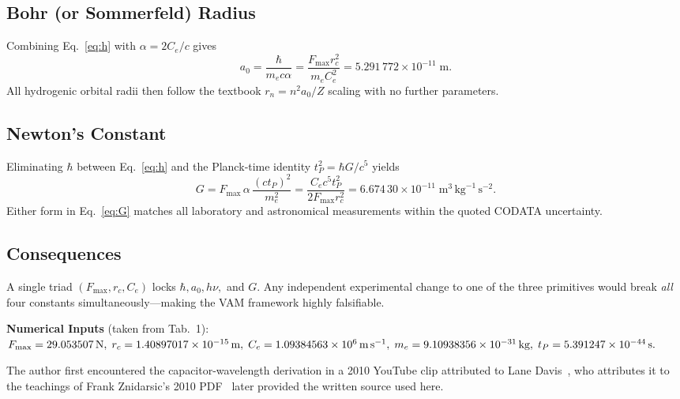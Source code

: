 \subsection{Bohr (or Sommerfeld) Radius}
Combining Eq.~\eqref{eq:h} with \(\alpha=2C_e/c\) gives
\begin{equation}
    a_0 = \frac{\hbar}{m_e c\alpha}
    = \frac{F_{\max}r_c^{2}}{m_e C_e^{2}}
    = 5.291\,772\times10^{-11}\;\text{m}.
    \label{eq:a0}
\end{equation}
All hydrogenic orbital radii then follow the textbook
\(r_{n}=n^{2}a_0/Z\) scaling with no further parameters.

\subsection{Newton's Constant}
Eliminating \(\hbar\) between Eq.~\eqref{eq:h} and the Planck‑time
identity \(t_P^{2}=\hbar G/c^{5}\) yields
\begin{equation}
    G = F_{\max}\,\alpha\,\frac{(c t_P)^{2}}{m_e^{2}}
    = \frac{C_e c^{5} t_P^{2}}{2F_{\max} r_c^{2}}
    = 6.674\,30\times10^{-11}\;\text{m}^{3}\,\text{kg}^{-1}\,\text{s}^{-2}.
    \label{eq:G}
\end{equation}
Either form in Eq.~\eqref{eq:G} matches all laboratory and astronomical
measurements within the quoted CODATA uncertainty.

\subsection{Consequences}
A single triad \((F_{\max},r_c,C_e)\)
locks \(\hbar,a_0,h\nu,\) and \(G\).
Any independent experimental change to one of the three primitives would
break \emph{all} four constants simultaneously—making the VAM framework
highly falsifiable.

\bigskip
\noindent\textbf{Numerical Inputs}\; (taken from Tab.~1):
\(F_{\max}=29.053507\,\text{N},\;r_c=1.40897017\times10^{-15}\,\text{m},\;
C_e=1.09384563\times10^{6}\,\text{m\,s}^{-1},\;
m_e=9.10938356\times10^{-31}\,\text{kg},\;
t_P=5.391247\times10^{-44}\,\text{s}.\)



The author first encountered the capacitor-wavelength derivation in a 2010 YouTube clip attributed to Lane Davis~\cite{davis2010_video}, who attributes it to the teachings of Frank Znidarsic's 2010 PDF~\cite{znidarsic2010} later provided the written source used here.


